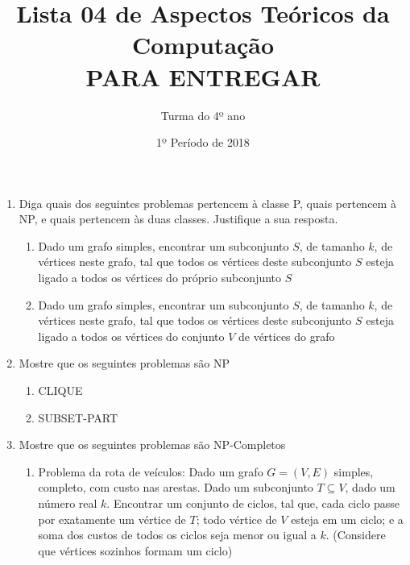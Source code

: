 \documentclass[12pt]{article}
\title{Lista 04 de Aspectos Teóricos da Computação
\\PARA ENTREGAR
}
\date{1º Período de 2018}
\author{Turma do 4º ano}
\begin{document}
 

\maketitle


\begin{enumerate}

\item Diga quais dos seguintes problemas pertencem à classe P, quais pertencem à NP, e quais pertencem às duas classes. Justifique a sua resposta.

\begin{enumerate}

\item Dado um grafo simples, encontrar um subconjunto $S$, de tamanho $k$, de vértices neste grafo, tal que todos os vértices deste subconjunto $S$ esteja ligado a todos os vértices do próprio subconjunto $S$

\item Dado um grafo simples, encontrar um subconjunto $S$, de tamanho $k$, de vértices neste grafo, tal que todos os vértices deste subconjunto $S$ esteja ligado a todos os vértices do conjunto $V$ de vértices do grafo

\end{enumerate}


\item Mostre que os seguintes problemas são NP

\begin{enumerate}

\item CLIQUE

\item SUBSET-PART

\end{enumerate}

\item Mostre que os seguintes problemas são NP-Completos

\begin{enumerate}

\item Problema da rota de veículos: Dado um grafo $G = (V,E)$ simples, completo, com custo nas arestas. Dado um subconjunto $T\subseteq V$, dado um número real $k$. Encontrar um conjunto de ciclos, tal que, cada ciclo passe por exatamente um vértice de $T$; todo vértice de $V$ esteja em um ciclo; e a soma dos custos de todos os ciclos seja menor ou igual a $k$. (Considere que vértices sozinhos formam um ciclo)


\end{enumerate}
\end{enumerate}
\end{document}
